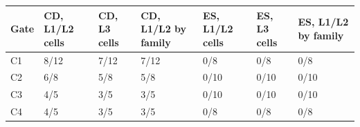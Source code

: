 \begin{tabular}{lllllll}
\toprule
Gate & CD, L1/L2 cells & CD, L3 cells & CD, L1/L2 by family & ES, L1/L2 cells & ES, L3 cells & ES, L1/L2 by family \\
\midrule
C1 & 8/12 & 7/12 & 7/12 & 0/8 & 0/8 & 0/8 \\
C2 & 6/8 & 5/8 & 5/8 & 0/10 & 0/10 & 0/10 \\
C3 & 4/5 & 3/5 & 3/5 & 0/10 & 0/10 & 0/10 \\
C4 & 4/5 & 3/5 & 3/5 & 0/8 & 0/8 & 0/8 \\
\bottomrule
\end{tabular}
